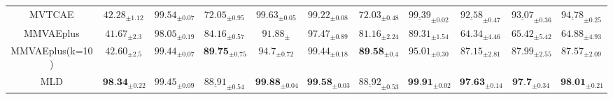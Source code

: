 \begin{table}[H]
{\begin{tabular}{c|c|ccc|ccc|ccc}
   
      \gls{MVTCAE} &  $42.28_{ \pm 1.12 }$ 
     &
    $99.54_{\pm 0.07 }$ & $72.05 _{\pm 0.95 }$ & $ 99.63_{\pm 0.05}$ & 
    $99.22_{ \pm 0.08  }$  & $72.03 _{\pm  0.48 }$  & $\underline{99.39}_{\pm0.02}$ &  
    $\underline{92.58}_{\pm0.47}$ & $\underline{93.07}_{\pm  0.36 }$  & $\underline{94.78}_{\pm0.25}$  \\

      \gls{MMVAEplus} &  $41.67_{ \pm 2.3 }$ 
     &
    $98.05_{\pm 0.19 }$ & $84.16_{\pm 	0.57 }$ & $ 91.88_{\pm }$ & 
    $97.47_{ \pm 0.89  }$  & $81.16_{\pm 2.24  }$  & $89.31_{\pm 1.54}$ &  
    $64.34_{\pm	4.46}$ & 
    $65.42_{\pm  5.42 }$  &
    $64.88_{\pm 4.93}$  \\

   \gls{MMVAEplus}(k=10) &  $42.60_{ \pm 2.5 }$ 
     &
    $99.44_{\pm 0.07 }$ & $\textbf{89.75} _{\pm 	0.75 }$ & $ 94.7_{\pm 0.72}$ & 
    $99.44_{ \pm 0.18  }$  
    & $\textbf{89.58}_{\pm 0.4  }$  & $95.01_{\pm0.30}$ &  
    $87.15_{\pm	2.81}$ & 
    $87.99_{\pm  2.55 }$  &
    $87.57_{\pm 2.09 }$  \\

    
    \midrule
 \gls{MLD} &  
 $\textbf{98.34}_{ \pm 0.22 }$
 &
    $99.45_{\pm 0.09 }$ &
    $\underline{88.91}_{\pm 0.54 }$ & 
    $ \textbf{99.88}_{\pm 0.04}$ & 
    
    $\textbf{99.58}_{ \pm 0.03  }$  & 
    $\underline{88.92} _{\pm  0.53 }$  & 
    $\textbf{99.91}_{\pm0.02}$ &  
    
    $\textbf{97.63}_{\pm0.14}$ & 
    $\textbf{97.7} _{\pm  0.34 }$ 
    & $\textbf{98.01}_{\pm 0.21}$  \\
    \bottomrule
   
\end{tabular}}
 \label{coh:mhd_detailed}

\end{table}





